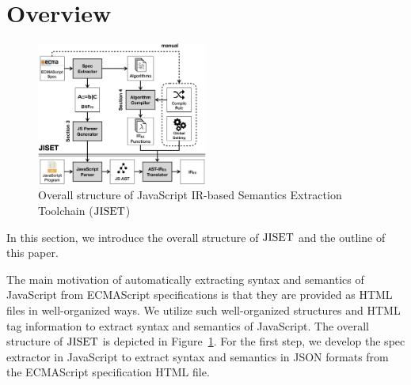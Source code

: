 \section{Overview}

\begin{figure}
  \centering
  \includegraphics[width=0.5\textwidth]{img/overview.png}
  \caption{Overall structure of JavaScript IR-based Semantics Extraction Toolchain (\( \text{JISET} \))}
  \label{fig:overview}
\vspace*{-1em}
\end{figure}

In this section, we introduce the overall structure of \( \text{JISET} \) and the outline of
this paper.

 The main motivation of automatically extracting syntax and semantics of JavaScript
from ECMAScript specifications is that they are provided as HTML files in well-organized ways.
We utilize such well-organized structures and HTML tag information to extract
syntax and semantics of JavaScript. The overall structure of \( \text{JISET} \) is depicted
in Figure~\ref{fig:overview}. For the first step, we develop the spec extractor
in JavaScript to extract syntax and semantics in JSON formats from
the ECMAScript specification HTML file.

